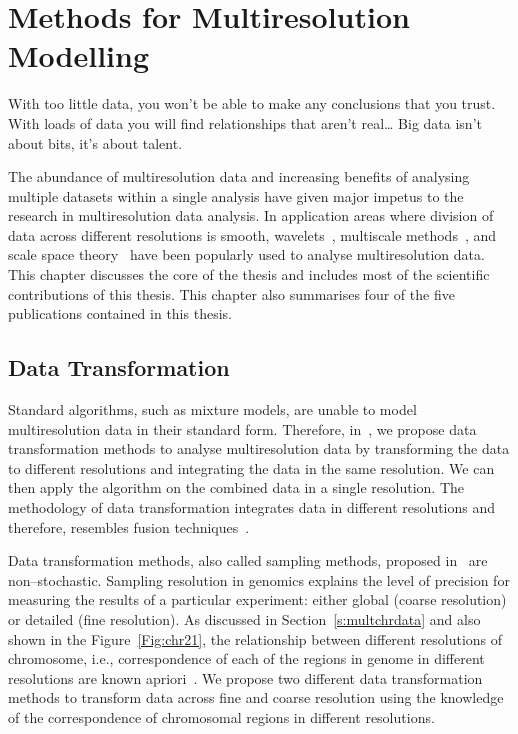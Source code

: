 \chapter[Methods of Multiresolution Modelling]{Methods for Multiresolution Modelling}
\label{ch:multiresmodel}

\begin{fquote}With too little data, you won’t be 
able to make any conclusions that you trust.  With loads of data 
you will find relationships that aren’t real… Big data isn’t 
about bits, it’s about talent.
 \end{fquote} 

\begin{synopsis}
The abundance of multiresolution data and increasing benefits of
analysing multiple datasets within a single analysis have given
major impetus to the research in multiresolution data analysis. 
In application areas where division of data across different 
resolutions is smooth, wavelets~\cite{jawerth94}, multiscale 
methods~\cite{barth2002multiscale,e2011principles}, and 
scale space theory~\cite{lindeberg94} have been popularly 
used to analyse multiresolution data. This chapter discusses 
the core of the thesis and includes most of the scientific 
contributions of this thesis. This chapter also summarises 
four of the five publications contained in this thesis.
\end{synopsis}


\section{Data Transformation}
\label{s:dataTransformation}
Standard algorithms, such as mixture models, are 
unable to model multiresolution data in their 
standard form. Therefore, in~, we propose 
data transformation methods to analyse multiresolution data 
by transforming the data to different resolutions and integrating 
the data in the same resolution. 
We can then apply the algorithm on the combined data in 
a single resolution. The methodology of data transformation
integrates data in different resolutions and therefore, 
resembles fusion techniques~\cite{carter1998analysis}.


Data transformation methods, also called sampling methods, 
proposed in~ are non--stochastic. 
Sampling resolution in genomics explains the level of precision 
for measuring the results of a particular experiment: either 
global (coarse resolution) or  detailed (fine resolution). As 
discussed in Section~\ref{s:multchrdata} and also shown in 
the Figure~\ref{Fig:chr21}, the relationship between different 
resolutions of chromosome, i.e., correspondence of each of the 
regions in genome in different resolutions are known  
apriori~\cite{shaffer05}. We propose two different data 
transformation methods to transform data across fine and coarse 
resolution using the knowledge of the correspondence of chromosomal 
regions in  different resolutions. 

